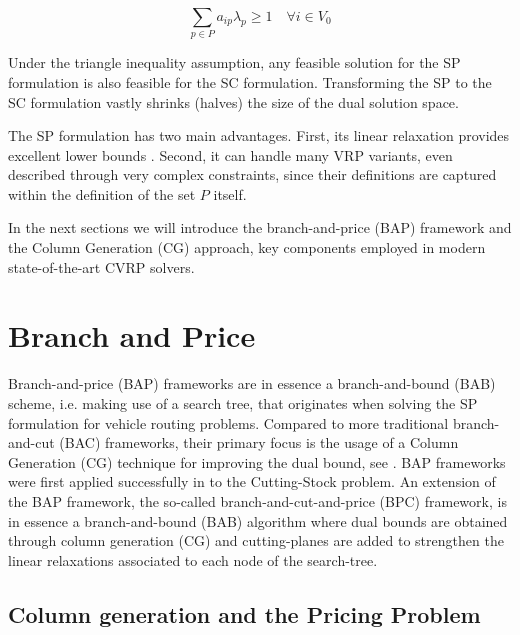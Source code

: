 \begin{equation}\label{eq:set-covering-customers-visited-by-exactly-one-route}
	\sum_{p \in P}  a_{ip} \lambda_p \ge 1  \quad \forall i \in V_0
\end{equation}

Under the triangle inequality assumption, any feasible solution for the SP formulation is also feasible for the SC formulation.
Transforming the SP to the SC formulation vastly shrinks (halves) the size of the dual solution space.

\medskip


The SP formulation has two main advantages.
First, its linear relaxation provides excellent lower bounds \parencite{bramel1997}.
Second, it can handle many VRP variants,
even described through very complex constraints,
since their definitions are captured within the definition of the set $P$ itself.


\medskip

In the next sections we will introduce
the branch-and-price (BAP) framework and the Column Generation (CG) approach,
key components employed in modern state-of-the-art CVRP solvers.


\section{Branch and Price}
\label{sec:intro-branch-and-price}

Branch-and-price (BAP) frameworks are in essence a branch-and-bound (BAB) scheme, i.e. making use of a search tree, that originates when solving the SP formulation for vehicle routing problems.
Compared to more traditional branch-and-cut (BAC) frameworks, their primary focus is the usage of a Column Generation (CG) technique for improving the dual bound, see \textcite{righini2008}.
BAP frameworks were first applied successfully in \textcite{gilmore1961} to the Cutting-Stock problem.
An extension of the BAP framework, the so-called branch-and-cut-and-price (BPC) framework,
is in essence a branch-and-bound (BAB) algorithm where dual bounds are obtained through column generation (CG)
and cutting-planes are added to strengthen the linear relaxations associated to each node of the search-tree.


\subsection{Column generation and the Pricing Problem}
\label{sec:column-generation-and-pricing-problem}

